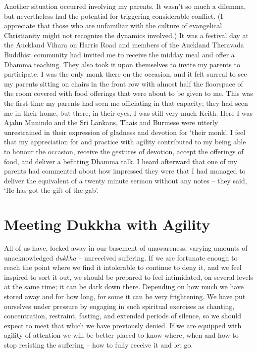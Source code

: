 Another situation occurred involving my parents. It wasn't so much a
dilemma, but nevertheless had the potential for triggering considerable
conflict. (I appreciate that those who are unfamiliar with the culture
of evangelical Christianity might not recognize the dynamics involved.)
It was a festival day at the Auckland Vihara on Harris Road and members
of the Auckland Theravada Buddhist community had invited me to receive
the midday meal and offer a Dhamma teaching. They also took it upon
themselves to invite my parents to participate. I was the only monk
there on the occasion, and it felt surreal to see my parents sitting on
chairs in the front row with almost half the floorspace of the room
covered with food offerings that were about to be given to me. This was
the first time my parents had seen me officiating in that capacity; they
had seen me in their home, but there, in their eyes, I was still very
much Keith. Here I was Ajahn Munindo and the Sri Lankans, Thais and
Burmese were utterly unrestrained in their expression of gladness and
devotion for `their monk'. I feel that my appreciation for and practice
with agility contributed to my being able to honour the occasion,
receive the gestures of devotion, accept the offerings of food, and
deliver a befitting Dhamma talk. I heard afterward that one of my
parents had commented about how impressed they were that I had managed
to deliver the equivalent of a twenty minute sermon without any notes --
they said, `He has got the gift of the gab'.

\section{Meeting Dukkha with Agility}

All of us have, locked away in our basement of unawareness, varying
amounts of unacknowledged \emph{dukkha} -- unreceived suffering. If we
are fortunate enough to reach the point where we find it intolerable to
continue to deny it, and we feel inspired to sort it out, we should be
prepared to feel intimidated, on several levels at the same time; it can
be dark down there. Depending on how much we have stored away and for
how long, for some it can be very frightening. We have put ourselves
under pressure by engaging in such spiritual exercises as chanting,
concentration, restraint, fasting, and extended periods of silence, so
we should expect to meet that which we have previously denied. If we are
equipped with agility of attention we will be better placed to know
where, when and how to stop resisting the suffering -- how to fully
receive it and let go.

